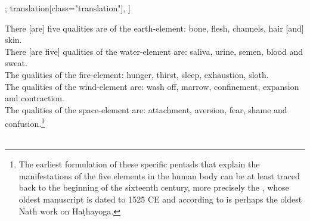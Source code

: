 \begin{alignment}[
  texts=edition[class="edition"];
  translation[class="translation"],
  ]
\begin{translation}
\begin{tlate}[p50_01]
There [are] five qualities are of the earth-element: bone, flesh, channels, hair [and] skin.\\

There [are five] qualities of the water-element are: saliva, urine, semen, blood and sweat.\\

The qualities of the fire-element: hunger, thirst, sleep, exhaustion, sloth.\\

The qualities of the wind-element are: wash off, marrow, confinement, expansion and contraction.\\

The qualities of the space-element are: attachment, aversion, fear, shame and confusion.\footnote{The earliest formulation of these specific pentads that explain the manifestations of the five elements in the human body can be at least traced back to the beginning of the sixteenth century, more precisely the , whose oldest manuscript is dated to 1525 CE and according to \citeauthor[2011:16]{mallinsonnath} is perhaps the oldest Nath work on Haṭhayoga.} \\\
\flushpage
    \end{tlate}
  \end{translation}
\end{alignment}
\pagebreak %
